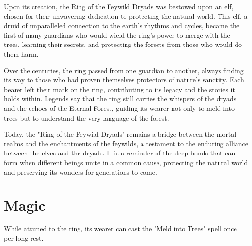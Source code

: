 \documentclass[letterpaper,openany,oneside,twocolumn]{book}
\begin{document}
Upon its creation, the Ring of the Feywild Dryads was bestowed upon an elf, chosen for their unwavering dedication to protecting the natural world. This elf, a druid of unparalleled connection to the earth's rhythms and cycles, became the first of many guardians who would wield the ring's power to merge with the trees, learning their secrets, and protecting the forests from those who would do them harm.

Over the centuries, the ring passed from one guardian to another, always finding its way to those who had proven themselves protectors of nature's sanctity. Each bearer left their mark on the ring, contributing to its legacy and the stories it holds within. Legends say that the ring still carries the whispers of the dryads and the echoes of the Eternal Forest, guiding its wearer not only to meld into trees but to understand the very language of the forest.

Today, the "Ring of the Feywild Dryads" remains a bridge between the mortal realms and the enchantments of the feywilds, a testament to the enduring alliance between the elves and the dryads. It is a reminder of the deep bonds that can form when different beings unite in a common cause, protecting the natural world and preserving its wonders for generations to come.
\section*{Magic}
While attuned to the ring, its wearer can cast the "Meld into Trees" spell once per long rest.
\end{document}

